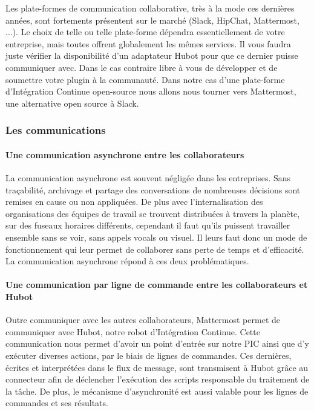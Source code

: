         Les plate-formes de communication collaborative, très à la mode ces dernières années, sont fortements présentent sur le marché (Slack, HipChat, Mattermost, ...). Le choix de telle ou telle plate-forme dépendra essentiellement de votre entreprise, mais toutes offrent globalement les mêmes services. Il vous faudra juste vérifier la disponibilité d'un adaptateur Hubot pour que ce dernier puisse communiquer avec. Dans le cas contraire libre à vous de développer et de soumettre votre plugin à la communauté. Dans notre cas d'une plate-forme d'Intégration Continue open-source nous allons nous tourner vers Mattermost, une alternative open source à Slack.

        \subsubsection{Les communications}
          \paragraph{Une communication asynchrone entre les collaborateurs}
          La communication asynchrone est souvent négligée dans les entreprises. Sans traçabilité, archivage et partage des conversations de nombreuses décisions sont remises en cause ou non appliquées. De plus avec l'internalisation des organisations des équipes de travail se trouvent distribuées à travers la planète, sur des fuseaux horaires différents, cependant il faut qu'ils puissent travailler ensemble sans se voir, sans appels vocals ou visuel. Il leurs faut donc un mode de fonctionnement qui leur permet de collaborer sans perte de temps et d'efficacité. La communication asynchrone répond à ces deux problématiques.

          \paragraph{Une communication par ligne de commande entre les collaborateurs et Hubot}
          Outre communiquer avec les autres collaborateurs, Mattermost permet de communiquer avec Hubot, notre robot d'Intégration Continue. Cette communication nous permet d'avoir un point d'entrée sur notre PIC ainsi que d'y exécuter diverses actions, par le biais de lignes de commandes. Ces dernières, écrites et interprétées dans le flux de message, sont transmisent à Hubot grâce au connecteur afin de déclencher l'exécution des scripts responsable du traitement de la tâche. De plus, le mécanisme d'asynchronité est aussi valable pour les lignes de commandes et ses résultats.

